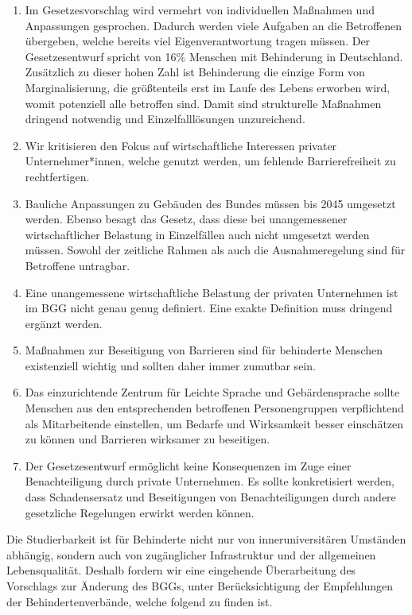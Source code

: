 \documentclass[DIV=calc]{scrartcl}
\begin{document}
\begin{enumerate}
	\item Im Gesetzesvorschlag wird vermehrt von individuellen Maßnahmen und Anpassungen gesprochen. Dadurch werden viele Aufgaben an die Betroffenen übergeben, welche bereits viel Eigenverantwortung tragen müssen. Der Gesetzesentwurf spricht von 16\% Menschen mit Behinderung in Deutschland. Zusätzlich zu dieser hohen Zahl ist Behinderung die einzige Form von Marginalisierung, die größtenteils erst im Laufe des Lebens erworben wird, womit potenziell alle betroffen sind. Damit sind strukturelle Maßnahmen dringend notwendig und Einzelfalllösungen unzureichend.
	\item Wir kritisieren den Fokus auf wirtschaftliche Interessen privater Unternehmer*innen, welche genutzt werden, um fehlende Barrierefreiheit zu rechtfertigen.
	\item Bauliche Anpassungen zu Gebäuden des Bundes müssen bis 2045 umgesetzt werden. Ebenso besagt das Gesetz, dass diese bei unangemessener wirtschaftlicher Belastung in Einzelfällen auch nicht umgesetzt werden müssen. Sowohl der zeitliche Rahmen als auch die Ausnahmeregelung sind für Betroffene untragbar.
	\item Eine unangemessene wirtschaftliche Belastung der privaten Unternehmen ist im BGG nicht genau genug definiert. Eine exakte Definition muss dringend ergänzt werden.
	\item  Maßnahmen zur Beseitigung von Barrieren sind für behinderte Menschen existenziell wichtig und sollten daher immer zumutbar sein.
	\item Das einzurichtende Zentrum für Leichte Sprache und Gebärdensprache sollte Menschen aus den entsprechenden betroffenen Personengruppen verpflichtend als Mitarbeitende einstellen, um Bedarfe und Wirksamkeit besser einschätzen zu können und Barrieren wirksamer zu beseitigen.
	\item Der Gesetzesentwurf ermöglicht keine Konsequenzen im Zuge einer Benachteiligung durch private Unternehmen. Es sollte konkretisiert werden, dass Schadensersatz und Beseitigungen von Benachteiligungen durch andere gesetzliche Regelungen erwirkt werden können.
\end{enumerate}

Die Studierbarkeit ist für Behinderte nicht nur von inneruniversitären Umständen abhängig, sondern auch von zugänglicher Infrastruktur und der allgemeinen Lebensqualität. Deshalb fordern wir eine eingehende Überarbeitung des Vorschlags zur Änderung des BGGs, unter Berücksichtigung der Empfehlungen der Behindertenverbände, welche folgend zu finden ist.
\end{document}
